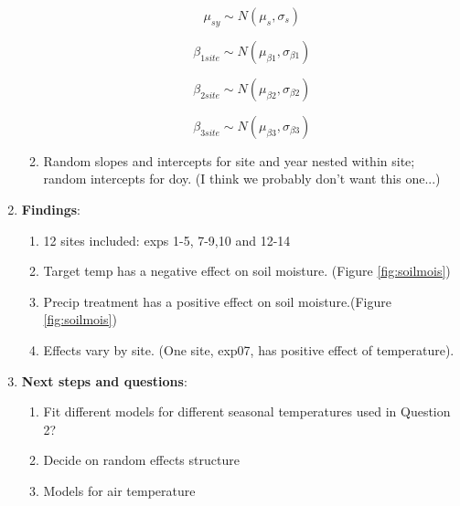 \documentclass{article}
\begin{document}
\begin{singlespace}
\begin{enumerate}
\begin{enumerate}
\begin{equation}
\mu_{sy} \sim N(\mu_{s}, \sigma_{s})
\end{equation}

\begin{equation}
\beta_{1 site} \sim N(\mu_{\beta1}, \sigma_{\beta1})
\end{equation}

\begin{equation}
\beta_{2 site} \sim N(\mu_{\beta2}, \sigma_{\beta2})
\end{equation}

\begin{equation}
\beta_{3 site} \sim N(\mu_{\beta3}, \sigma_{\beta3})
\end{equation}
\item{Random slopes and intercepts for site and year nested within site; random intercepts for doy. (I think we probably don't want this one...)}

\end{enumerate}

\item{\textbf{Findings}}:
\begin{enumerate}
\item{12 sites included: exps 1-5, 7-9,10 and 12-14}
\item{Target temp has a negative effect on soil moisture. (Figure \ref {fig:soilmois})}
\item{Precip treatment has a positive effect on soil moisture.(Figure \ref {fig:soilmois})}
\item{Effects vary by site. (One site, exp07, has positive effect of temperature).}
\end{enumerate}
\item{\textbf{Next steps  and questions}}:
\begin{enumerate}
\item{Fit different models for different seasonal temperatures used in Question 2?}
\item{Decide on random effects structure}
\item{Models for air temperature}
\end{enumerate}

\end{enumerate}


\end{singlespace}
\end{document}
